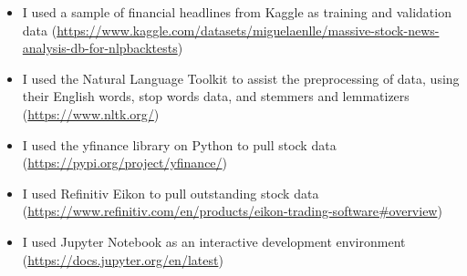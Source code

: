 \documentclass[ oneside,%
                    author={Joshua Felmeden},
                    degree={MEng},
                     title={Sentiment Analysis of Financial Headlines Based on Stock Returns},
                  subtitle={Research}]{dissertation}
\begin{document}


\begin{itemize}
      \item I used a sample of financial headlines from Kaggle as training and validation data (\url{https://www.kaggle.com/datasets/miguelaenlle/massive-stock-news-analysis-db-for-nlpbacktests})
      \item I used the Natural Language Toolkit to assist the preprocessing of data, using their English words, stop words data, and stemmers and lemmatizers (\url{https://www.nltk.org/})
      \item I used the yfinance library on Python to pull stock data (\url{https://pypi.org/project/yfinance/})
      \item I used Refinitiv Eikon to pull outstanding stock data (\url{https://www.refinitiv.com/en/products/eikon-trading-software#overview})
      \item I used Jupyter Notebook as an interactive development environment (\url{https://docs.jupyter.org/en/latest})
\end{itemize}
\end{document}
